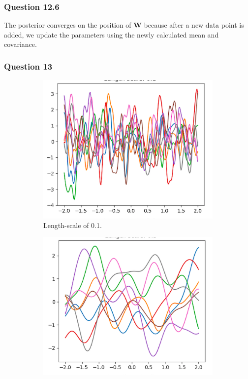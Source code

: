 \documentclass[10pt, a4paper, twocolumn]{article} %
\begin{document}
\subsubsection*{Question 12.6}
The posterior converges on the position of $\mathbf{W}$ because after a new data point is added, we update the parameters using the newly calculated mean and covariance. 
\subsubsection*{Question 13}

\begin{figure}[!htb]
\centering
\begin{subfigure}{.5\linewidth}
  \centering
  \includegraphics[width=.9\linewidth]{ls01.png}
  \caption{Length-scale of 0.1.}
  \label{fig:sub1}
\end{subfigure}%
\begin{subfigure}{.5\linewidth}
  \centering
  \includegraphics[width=.9\linewidth]{ls05.png}

\end{subfigure}
\end{figure}
\end{document}
